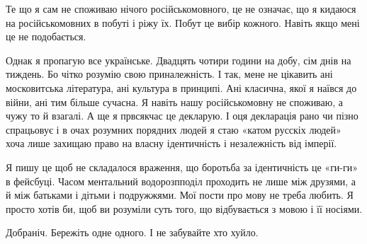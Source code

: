 Те що я сам не споживаю нічого російськомовного, це не означає, що я кидаюся на
російськомовних в побуті і ріжу їх. Побут це вибір кожного. Навіть якщо мені це
не подобається.

Однак я пропагую все українське. Двадцять чотири години на добу, сім днів на
тиждень. Бо чітко розумію свою приналежність. І так, мене не цікавить ані
московитська література, ані культура в принципі. Ані класична, якої я наївся
до війни, ані тим більше сучасна. Я навіть нашу російськомовну не споживаю, а
чужу то й взагалі. А ще я првсякчас це декларую. І оця декларація рано чи пізно
спрацьовує і в очах розумних порядних людей я стаю «катом русскіх людей» хоча
лише захищаю право на власну ідентичність і незалежність від імперії.

Я пишу це щоб не складалося враження, що боротьба за ідентичність це «ги-ги» в
фейсбуці. Часом ментальний водорозпподіл проходить не лише між друзями, а й між
батьками і дітьми і подружжями. Мої пости про мову не треба любить. Я просто
хотів би, щоб ви розуміли суть того, що відбувається з мовою і її носіями.

Добраніч. Бережіть одне одного. І не забувайте хто хуйло.
